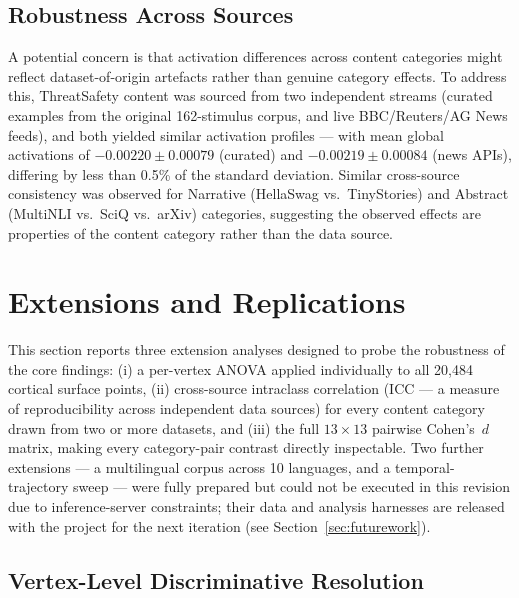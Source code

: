 \documentclass[11pt,letterpaper]{article}
\begin{document}
\subsection{Robustness Across Sources}

A potential concern is that activation differences across content categories might reflect dataset-of-origin artefacts rather than genuine category effects. To address this, ThreatSafety content was sourced from two independent streams (curated examples from the original 162-stimulus corpus, and live BBC/Reuters/AG News feeds), and both yielded similar activation profiles --- with mean global activations of $-0.00220 \pm 0.00079$ (curated) and $-0.00219 \pm 0.00084$ (news APIs), differing by less than 0.5\% of the standard deviation. Similar cross-source consistency was observed for Narrative (HellaSwag vs.\ TinyStories) and Abstract (MultiNLI vs.\ SciQ vs.\ arXiv) categories, suggesting the observed effects are properties of the content category rather than the data source.

\FloatBarrier
\clearpage
\section{Extensions and Replications}\label{sec:extensions}

This section reports three extension analyses designed to probe the robustness of the core findings: (i) a per-vertex ANOVA applied individually to all 20{,}484 cortical surface points, (ii) cross-source intraclass correlation (ICC --- a measure of reproducibility across independent data sources) for every content category drawn from two or more datasets, and (iii) the full $13 \times 13$ pairwise Cohen's~$d$ matrix, making every category-pair contrast directly inspectable. Two further extensions --- a multilingual corpus across 10 languages, and a temporal-trajectory sweep --- were fully prepared but could not be executed in this revision due to inference-server constraints; their data and analysis harnesses are released with the project for the next iteration (see Section~\ref{sec:futurework}).

\subsection{Vertex-Level Discriminative Resolution}\label{sec:vertex}
\end{document}
